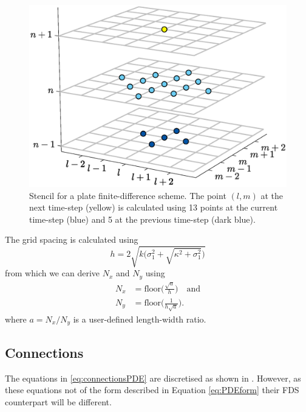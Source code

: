 \documentclass{article}
\begin{document}
\begin{figure}[h]
\centering
\includegraphics[width=1.0\columnwidth]{stencil2Dedit.eps}
\caption{Stencil for a plate finite-difference scheme. The point $(l,m)$ at the next time-step (yellow) is calculated using 13 points at the current time-step (blue) and 5 at the previous time-step (dark blue). \label{fig:stencil2D}}
\end{figure}

The grid spacing is calculated using \cite{Bilbao2009:ModularPercussion}
\begin{equation}
h = 2\sqrt{k\bigg(\sigma_1^2 + \sqrt{\kappa^2+ \sigma_1^2}\bigg)}
\end{equation}
from which we can derive $N_x$ and $N_y$ using
\begin{align}
    N_x &= \text{floor}\Bigg(\frac{\sqrt{a}}{h}\Bigg) \quad \text{and}\\
    N_y &= \text{floor}\Bigg(\frac{1}{h\sqrt{a}}\Bigg).
\end{align}
where $a = N_x / N_y$ is a user-defined length-width ratio.


\subsection{Connections}
The equations in \eqref{eq:connectionsPDE} are discretised as shown in \cite{Bilbao2009:ModularPercussion}. However, as these equations not of the form described in Equation \eqref{eq:PDEform} their FDS counterpart will be different.
\end{document}
